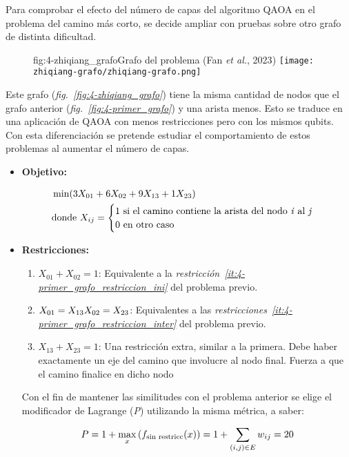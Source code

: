 Para comprobar el efecto del número de capas del algoritmo QAOA en el problema del camino más corto, se decide ampliar con pruebas sobre otro grafo de distinta dificultad.

\begin{figure}[Grafo para estudio de capas {--} camino más corto]{fig:4-zhiqiang_grafo}{Grafo del problema (Fan \textit{et al.}, 2023\cite{solving_shortest_path_with_qaoa})}
  \centering
  \texttt{[image: zhiqiang-grafo/zhiqiang-grafo.png]}
\end{figure}

Este grafo (\textit{fig.~\ref{fig:4-zhiqiang_grafo}}) tiene la misma cantidad de nodos que el grafo anterior (\textit{fig.~\ref{fig:4-primer_grafo}}) y una arista menos.
Esto se traduce en una aplicación de QAOA con menos restricciones pero con los mismos qubits.
\\
Con esta diferenciación se pretende estudiar el comportamiento de estos problemas al aumentar el número de capas.

\begin{itemize}
\item \textbf{Objetivo:}

  \begin{align}
    &\min(3X_{01} + 6X_{02} + 9X_{13} + 1X_{23}) \\
    &\textnormal{donde } X_{ij} = \begin{cases} \nonumber
      1 \textnormal{ si el camino contiene la arista del nodo \textit{i} al \textit{j}} \\
      0 \textnormal{ en otro caso}
    \end{cases}
  \end{align}

\item \textbf{Restricciones:}

  \begin{enumerate}
  \item $X_{01} + X_{02} = 1$: Equivalente a la \textit{restricción~\ref{it:4-primer_grafo_restriccion_ini}} del problema previo.

  \item $X_{01} = X_{13} \\
    X_{02} = X_{23}$: Equivalentes a las \textit{restricciones~\ref{it:4-primer_grafo_restriccion_inter}} del problema previo.

  \item $X_{13} + X_{23} = 1$:  Una restricción extra, similar a la primera.
    Debe haber exactamente un eje del camino que involucre al nodo final.
    Fuerza a que el camino finalice en dicho nodo

  \end{enumerate}

  Con el fin de mantener las similitudes con el problema anterior se elige el modificador de Lagrange (\textit{P}) utilizando la misma métrica, a saber:

  \begin{align}
    P = 1 + \max_{x}{(f_{\textnormal{sin restricc}}(x))} = 1 + \sum_{(i, j)\in{E}}{w_{ij}} = 20
  \end{align}

\end{itemize}

